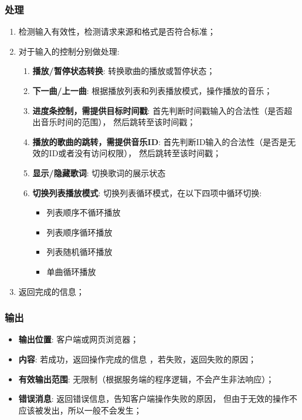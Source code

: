 \begin{enumerate}
\subsubsection{处理}
	\begin{enumerate}
		\item 检测输入有效性，检测请求来源和格式是否符合标准；
		\item 对于输入的控制分别做处理: 
		\begin{enumerate}
			\item \textbf{播放/暂停状态转换}: 
				转换歌曲的播放或暂停状态；
			\item \textbf{下一曲/上一曲}: 
				根据播放列表和列表播放模式，操作播放的音乐；
			\item \textbf{进度条控制，需提供目标时间戳}: 
				首先判断时间戳输入的合法性（是否超出音乐时间的范围），
				然后跳转至该时间戳；
			\item \textbf{播放的歌曲的跳转，需提供音乐ID}: 
				首先判断ID输入的合法性（是否是无效的ID或者没有访问权限），
				然后跳转至该时间戳；
			\item \textbf{显示/隐藏歌词}: 
				切换歌词的展示状态
			\item \textbf{切换列表播放模式}: 
				切换列表循环模式，在以下四项中循环切换: 
					\begin{itemize}
						\item 列表顺序不循环播放
						\item 列表顺序循环播放
						\item 列表随机循环播放
						\item 单曲循环播放
					\end{itemize}
		\end{enumerate}
		\item 返回完成的信息；
	\end{enumerate}
\subsubsection{输出}
\begin{itemize}
	\item \textbf{输出位置}: 客户端或网页浏览器；
	\item \textbf{内容}: 若成功，返回操作完成的信息 ，若失败，返回失败的原因；
	\item \textbf{有效输出范围}: 无限制（根据服务端的程序逻辑，不会产生非法响应）；
	\item \textbf{错误消息}: 返回错误信息，告知客户端操作失败的原因，
		但由于无效的操作不应该被发出，所以一般不会发生；
\end{itemize}


\end{enumerate}
